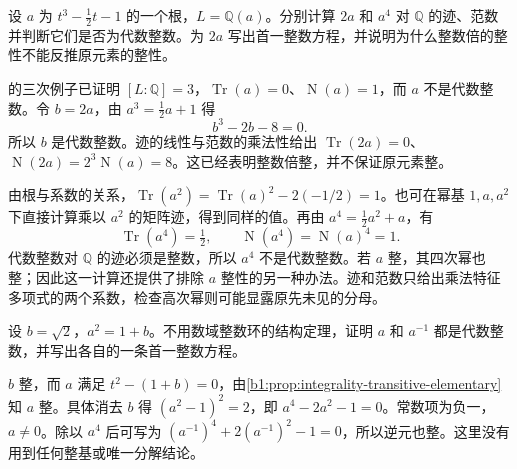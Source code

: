 \begin{exercise}\label{b1:ex:18-integrality-counterexample}
	设 \(a\) 为 \(t^3-\tfrac12t-1\) 的一个根，\(L=\mathbb Q(a)\)。分别计算 \(2a\) 和 \(a^4\) 对 \(\mathbb Q\) 的迹、范数并判断它们是否为代数整数。为 \(2a\) 写出首一整数方程，并说明为什么整数倍的整性不能反推原元素的整性。
\end{exercise}
\begin{solution}
	的三次例子已证明 \([L:\mathbb Q]=3\)，\(\operatorname{Tr}(a)=0\)、\(\operatorname{N}(a)=1\)，而 \(a\) 不是代数整数。令 \(b=2a\)，由 \(a^3=\tfrac12a+1\) 得
	\[
		b^3-2b-8=0.
	\]
	所以 \(b\) 是代数整数。迹的线性与范数的乘法性给出 \(\operatorname{Tr}(2a)=0\)、\(\operatorname{N}(2a)=2^3\operatorname{N}(a)=8\)。这已经表明整数倍整，并不保证原元素整。

	由根与系数的关系，\(\operatorname{Tr}(a^2)=\operatorname{Tr}(a)^2-2(-1/2)=1\)。也可在幂基 \(1,a,a^2\) 下直接计算乘以 \(a^2\) 的矩阵迹，得到同样的值。再由 \(a^4=\tfrac12a^2+a\)，有
	\[
		\operatorname{Tr}(a^4)=\tfrac12,\qquad \operatorname{N}(a^4)=\operatorname{N}(a)^4=1.
	\]
	代数整数对 \(\mathbb Q\) 的迹必须是整数，所以 \(a^4\) 不是代数整数。若 \(a\) 整，其四次幂也整；因此这一计算还提供了排除 \(a\) 整性的另一种办法。迹和范数只给出乘法特征多项式的两个系数，检查高次幂则可能显露原先未见的分母。
\end{solution}

\begin{exercise}\label{b1:ex:18-integrality-tower}
	设 \(b=\sqrt2\)，\(a^2=1+b\)。不用数域整数环的结构定理，证明 \(a\) 和 \(a^{-1}\) 都是代数整数，并写出各自的一条首一整数方程。
\end{exercise}
\begin{solution}
	\(b\) 整，而 \(a\) 满足 \(t^2-(1+b)=0\)，由\cref{b1:prop:integrality-transitive-elementary}知 \(a\) 整。具体消去 \(b\) 得 \((a^2-1)^2=2\)，即 \(a^4-2a^2-1=0\)。常数项为负一，\(a\ne0\)。除以 \(a^4\) 后可写为 \((a^{-1})^4+2(a^{-1})^2-1=0\)，所以逆元也整。这里没有用到任何整基或唯一分解结论。
\end{solution}
